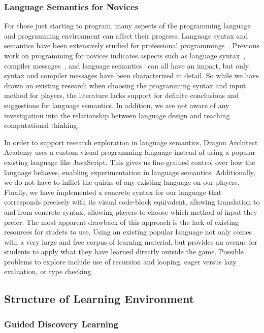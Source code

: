 \documentclass{sig-alternate}
\newcommand{\gametitle}{{\color{RoyalPurple} Dragon Architect Academy}}
\begin{document}
\subsubsection{Language Semantics for Novices}

For those just starting to program, many aspects of the programming language and programming environment can affect their progress. 
Language syntax and semantics have been extensively studied for professional programmings~\cite{hudak1994haskell, kennedy2004defining, delorey2007programming}.
Previous work on programming for novices indicates aspects such as language syntax~\cite{stefik2013syntax}, compiler messages~\cite{nienaltowski2008compiler}, and language semantics~\cite{hoc1990language} can all have an impact, but only syntax and compiler messages have been characterized in detail. 
So while we have drawn on existing research when choosing the programming syntax and input method for players, the literature lacks support for definite conclusions and suggestions for language semantics. 
In addition, we are not aware of any investigation into the relationship between language design and teaching computational thinking.

In order to support research exploration in language semantics, \gametitle{} uses a custom visual programming language instead of using a popular existing language like JavaScript. 
This gives us fine-grained control over how the language behaves, enabling experimentation in language semantics.
Additionally, we do not have to inflict the quirks of any existing language on our players. 
Finally, we have implemented a concrete syntax for our language that corresponds precisely with its visual code-block equivalent, allowing translation to and from concrete syntax, allowing players to choose which method of input they prefer.  
The most apparent drawback of this approach is the lack of existing resources for studets to use.
Using an existing popular language not only comes with a very large and free corpus of learning material, but provides an avenue for students to apply what they have learned directly outside the game.
Possible problems to explore include use of recursion and looping, eager versus lazy evaluation, or type checking.

\subsection{Structure of Learning Environment}

\subsubsection{Guided Discovery Learning}
\label{sec:guided_discovery_theory}
\end{document}
